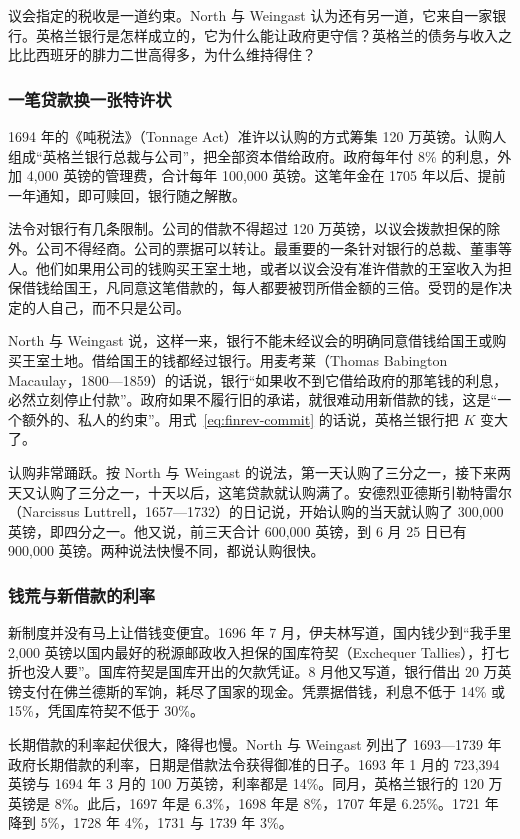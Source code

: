 议会指定的税收是一道约束。North 与 Weingast 认为还有另一道，它来自一家银行。英格兰银行是怎样成立的，它为什么能让政府更守信？英格兰的债务与收入之比比西班牙的腓力二世高得多，为什么维持得住？

\subsubsection{一笔贷款换一张特许状}
1694 年的《吨税法》（Tonnage Act）准许以认购的方式筹集 120 万英镑。认购人组成“英格兰银行总裁与公司”，把全部资本借给政府。政府每年付 8\% 的利息，外加 4,000 英镑的管理费，合计每年 100,000 英镑\cite{andreades1909}。这笔年金在 1705 年以后、提前一年通知，即可赎回，银行随之解散\cite{statutes1694}。

法令对银行有几条限制。公司的借款不得超过 120 万英镑，以议会拨款担保的除外。公司不得经商。公司的票据可以转让\cite{statutes1694}。最重要的一条针对银行的总裁、董事等人。他们如果用公司的钱购买王室土地，或者以议会没有准许借款的王室收入为担保借钱给国王，凡同意这笔借款的，每人都要被罚所借金额的三倍\cite{statutes1694}。受罚的是作决定的人自己，而不只是公司。

North 与 Weingast 说，这样一来，银行不能未经议会的明确同意借钱给国王或购买王室土地。借给国王的钱都经过银行。用麦考莱（Thomas Babington Macaulay，1800—1859）的话说，银行“如果收不到它借给政府的那笔钱的利息，必然立刻停止付款”\cite{nw1989}。政府如果不履行旧的承诺，就很难动用新借款的钱，这是“一个额外的、私人的约束”\cite{nw1989}。用式~\eqref{eq:finrev-commit} 的话说，英格兰银行把 $K$ 变大了。

认购非常踊跃。按 North 与 Weingast 的说法，第一天认购了三分之一，接下来两天又认购了三分之一，十天以后，这笔贷款就认购满了\cite{nw1989}。安德烈亚德斯引勒特雷尔（Narcissus Luttrell，1657—1732）的日记说，开始认购的当天就认购了 300,000 英镑，即四分之一。他又说，前三天合计 600,000 英镑，到 6 月 25 日已有 900,000 英镑\cite{andreades1909}。两种说法快慢不同，都说认购很快。

\subsubsection{钱荒与新借款的利率}
新制度并没有马上让借钱变便宜。1696 年 7 月，伊夫林写道，国内钱少到“我手里 2,000 英镑以国内最好的税源邮政收入担保的国库符契（Exchequer Tallies），打七折也没人要”。国库符契是国库开出的欠款凭证。8 月他又写道，银行借出 20 万英镑支付在佛兰德斯的军饷，耗尽了国家的现金。凭票据借钱，利息不低于 14\% 或 15\%，凭国库符契不低于 30\%\cite{evelyn1901}。

长期借款的利率起伏很大，降得也慢。North 与 Weingast 列出了 1693—1739 年政府长期借款的利率，日期是借款法令获得御准的日子。1693 年 1 月的 723,394 英镑与 1694 年 3 月的 100 万英镑，利率都是 14\%。同月，英格兰银行的 120 万英镑是 8\%。此后，1697 年是 6.3\%，1698 年是 8\%，1707 年是 6.25\%。1721 年降到 5\%，1728 年 4\%，1731 与 1739 年 3\%\cite{nw1989}。

